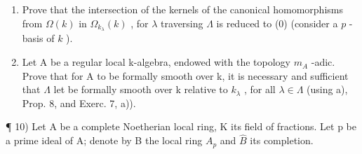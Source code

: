 \begin{enumerate}
\def\labelenumi{\alph{enumi})}
\item
  Prove that the intersection of the kernels of the canonical homomorphisms from \(\Omega(k)\) in \(\Omega_{k_{\lambda}}(k)\) , for \(\lambda\) traversing \(\Lambda\) is reduced to (0) (consider a \(p\) -basis of \(k\) ).
\item
  Let A be a regular local k-algebra, endowed with the topology \(m_{A}\) -adic. Prove that for A to be formally smooth over k, it is necessary and sufficient that \(\Lambda\) let be formally smooth over k relative to \(k_{\lambda}\) , for all \(\lambda \in \Lambda\) (using a), Prop. 8, and Exerc. 7, a)).
\end{enumerate}

¶ 10) Let A be a complete Noetherian local ring, K its field of fractions. Let p be a prime ideal of A; denote by B the local ring \(A_{p}\) and \(\widehat{B}\) its completion.

